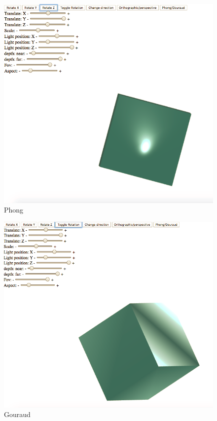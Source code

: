 \documentclass{article}
\begin{document}
\begin{enumerate}
\begin{figure}[!ht]
\centering
\includegraphics[scale=0.40]{HW1}
\caption{Phong}
\label{fig:fig1}
\end{figure}

\begin{figure}[!ht]
\centering
\includegraphics[scale=0.30]{HW2}
\caption{Gouraud}
\label{fig:fig1}
\end{figure}

\end{enumerate}
\end{document}
